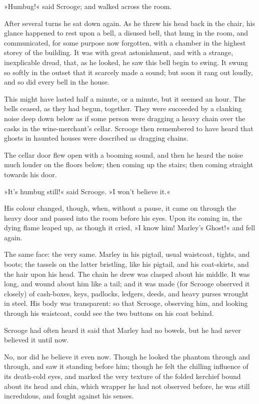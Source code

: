 »Humbug!« said Scrooge; and walked across the room.

After several turns he sat down again. As he threw his head back in the chair, his glance happened to rest upon a bell, a disused bell, that hung in the room, and communicated, for some purpose now forgotten, with a chamber in the highest storey of the building. It was with great astonishment, and with a strange, inexplicable dread, that, as he looked, he saw this bell begin to swing. It swung so softly in the outset that it scarcely made a sound; but soon it rang out loudly, and so did every bell in the house.

This might have lasted half a minute, or a minute, but it seemed an hour. The bells ceased, as they had begun, together. They were succeeded by a clanking noise deep down below as if some person were dragging a heavy chain over the casks in the wine-merchant's cellar. Scrooge then remembered to have heard that ghosts in haunted houses were described as dragging chains.

The cellar door flew open with a booming sound, and then he heard the noise much louder on the floors below; then coming up the stairs; then coming straight towards his door.

»It's humbug still!« said Scrooge. »I won't believe it.«

His colour changed, though, when, without a pause, it came on through the heavy door and passed into the room before his eyes. Upon its coming in, the dying flame leaped up, as though it cried, »I know him! Marley's Ghost!« and fell again.

The same face: the very same. Marley in his pigtail, usual waistcoat, tights, and boots; the tassels on the latter bristling, like his pigtail, and his coat-skirts, and the hair upon his head. The chain he drew was clasped about his middle. It was long, and wound about him like a tail; and it was made (for Scrooge observed it closely) of cash-boxes, keys, padlocks, ledgers, deeds, and heavy purses wrought in steel. His body was transparent: so that Scrooge, observing him, and looking through his waistcoat, could see the two buttons on his coat behind.

Scrooge had often heard it said that Marley had no bowels, but he had never believed it until now.

No, nor did he believe it even now. Though he looked the phantom through and through, and saw it standing before him; though he felt the chilling influence of its death-cold eyes, and marked the very texture of the folded kerchief bound about its head and chin, which wrapper he had not observed before, he was still incredulous, and fought against his senses.

